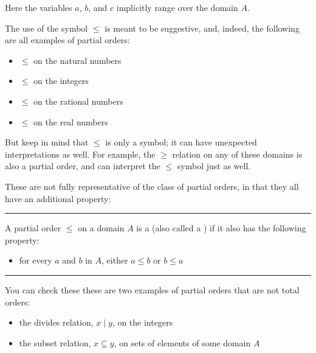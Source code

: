 \documentclass[letterpaper,10pt,english]{sphinxmanual}
\begin{document}
\sphinxAtStartPar
Here the variables \(a\), \(b\), and \(c\) implicitly range over the domain \(A\).

\sphinxAtStartPar
The use of the symbol \(\leq\) is meant to be suggestive, and, indeed, the following are all examples of partial orders:
\begin{itemize}
\item {} 
\sphinxAtStartPar
\(\leq\) on the natural numbers

\item {} 
\sphinxAtStartPar
\(\leq\) on the integers

\item {} 
\sphinxAtStartPar
\(\leq\) on the rational numbers

\item {} 
\sphinxAtStartPar
\(\leq\) on the real numbers

\end{itemize}

\sphinxAtStartPar
But keep in mind that \(\leq\) is only a symbol; it can have unexpected interpretations as well. For example, the \(\geq\) relation on any of these domains is also a partial order, and can interpret the \(\leq\) symbol just as well.

\sphinxAtStartPar
These are not fully representative of the class of partial orders, in that they all have an additional property:


\bigskip\hrule\bigskip


\sphinxAtStartPar
{} A partial order \(\leq\) on a domain \(A\) is a  (also called a ) if it also has the following property:
\begin{itemize}
\item {} 
\sphinxAtStartPar
for every \(a\) and \(b\) in \(A\), either \(a \leq b\) or \(b \leq a\)

\end{itemize}


\bigskip\hrule\bigskip


\sphinxAtStartPar
You can check these these are two examples of partial orders that are not total orders:
\begin{itemize}
\item {} 
\sphinxAtStartPar
the divides relation, \(x \mid y\), on the integers

\item {} 
\sphinxAtStartPar
the subset relation, \(x \subseteq y\), on sets of elements of some domain \(A\)

\end{itemize}
\end{document}
